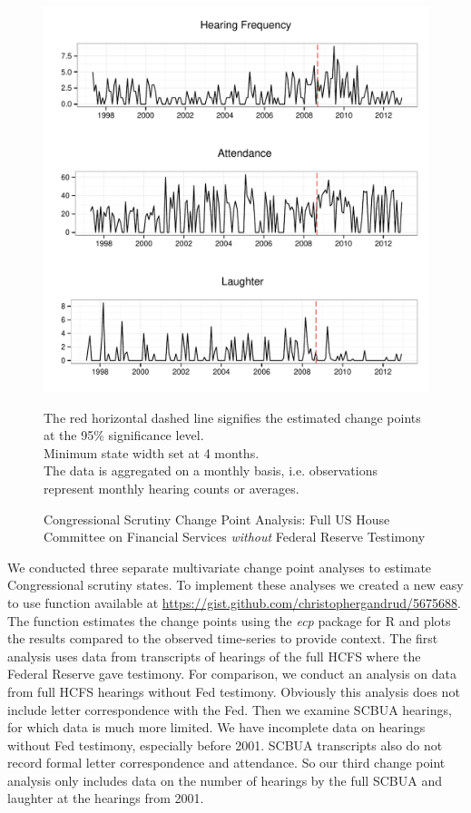 \documentclass[a4paper]{article}\usepackage[]{graphicx}\usepackage[]{color}
\newenvironment{knitrout}{}{} %
\begin{document}
\begin{figure}
    \caption{Congressional Scrutiny Change Point Analysis: Full US House Committee on Financial Services \emph{without} Federal Reserve Testimony}
    \label{fig:BaseNonFedCP}
\begin{knitrout}
\color{fgcolor}

{\centering \includegraphics[width=0.8\linewidth]{figure/ScrutinyNonFedCP} 

}



\end{knitrout}
{\scriptsize{The red horizontal dashed line signifies the estimated change points at the 95\% significance level.\\
Minimum state width set at 4 months. \\
The data is aggregated on a monthly basis, i.e. observations represent monthly hearing counts or averages.}}
\end{figure}

We conducted three separate multivariate change point analyses to estimate Congressional scrutiny states. To implement these analyses we created a new easy to use function available at \url{https://gist.github.com/christophergandrud/5675688}. The function estimates the change points using the \emph{ecp} \citep{R-ecp} package for R \citep{CiteR} and plots the results compared to the observed time-series to provide context. The first analysis uses data from transcripts of hearings of the full HCFS where the Federal Reserve gave testimony. For comparison, we conduct an analysis on data from full HCFS hearings without Fed testimony. Obviously this analysis does not include letter correspondence with the Fed. Then we examine SCBUA hearings, for which data is much more limited. We have incomplete data on hearings without Fed testimony, especially before 2001. SCBUA transcripts also do not record formal letter correspondence and attendance. So our third change point analysis only includes data on the number of hearings by the full SCBUA and laughter at the hearings from 2001.
\end{document}
